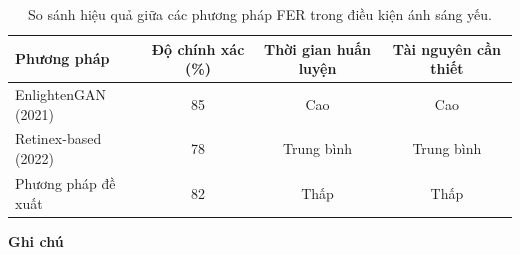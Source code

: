\begin{table}[h]
    \centering
    \begin{tabular}{|l|c|c|c|}
        \hline
        \textbf{Phương pháp} & \textbf{Độ chính xác (\%)} & \textbf{Thời gian huấn luyện} & \textbf{Tài nguyên cần thiết} \\
        \hline
        EnlightenGAN (2021) & 85 & Cao & Cao \\
        Retinex-based (2022) & 78 & Trung bình & Trung bình \\
        Phương pháp đề xuất & 82 & Thấp & Thấp \\
        \hline
    \end{tabular}
    \caption{So sánh hiệu quả giữa các phương pháp FER trong điều kiện ánh sáng yếu.}
    \label{tab:method_comparison}
\end{table}

\textbf{Ghi chú}